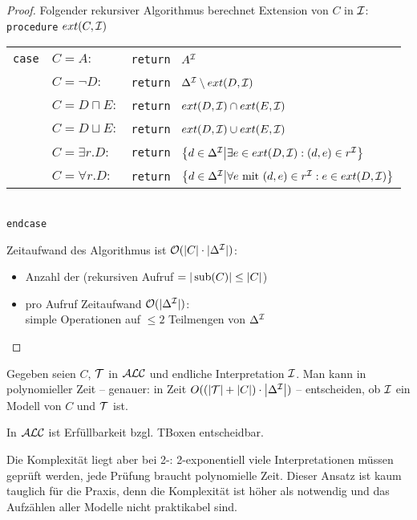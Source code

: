 \begin{proof}
    Folgender rekursiver Algorithmus berechnet Extension von $C$ in $\mathcal{I}$:\\
    \texttt{procedure} $ext(C, \mathcal{I})$\\
    \begin{tabular}{l l l}
        \texttt{case} & $C = A:$ & \texttt{return } $A^{\mathcal{I}}$\\
                      & $C = \neg D:$ & \texttt{return }
        $\Delta^{\mathcal{I}} \setminus ext(D, \mathcal{I})$\\
                      & $C = D \sqcap E:$ & \texttt{return }
        $ext(D, \mathcal{I}) \cap ext(E, \mathcal{I})$\\
                      & $C = D \sqcup E:$ & \texttt{return }
        $ext(D, \mathcal{I}) \cup ext(E, \mathcal{I})$\\
                      & $C = \exists r.D:$ & \texttt{return }
        $\left\{d\in \Delta^\MI \middle| \exists e\in ext(D, \MI) : (d, e) \in r^\MI\right\}$\\
                      & $C = \forall r.D:$ & \texttt{return }
        $\left\{d\in \Delta^\MI \middle| \forall e \text{ mit } (d, e) \in r^\MI : e\in ext(D, \MI)\right\}$\\
    \end{tabular}\\
    \texttt{endcase}

    Zeitaufwand des Algorithmus ist $\mathcal{O}(|C| \cdot |\Delta^{\mathcal{I}}|)$:
    \begin{itemize}
        \item Anzahl der (rekursiven Aufruf $= |\operatorname{sub}(C)| \leq |C|$)
        \item pro Aufruf Zeitaufwand $\mathcal{O}(|\Delta^{\mathcal{I}}|)$: \\
            simple Operationen auf $\leq 2$ Teilmengen von $\Delta^{\mathcal{I}}$
    \end{itemize}
\end{proof}

\begin{korollar}
Gegeben seien $C$, $\mathcal{T}$ in $\mathcal{A}\mathcal{L}\mathcal{C}$ und endliche Interpretation $\mathcal{I}$. Man kann in polynomieller Zeit -- genauer: in Zeit $O(\left( \left| \MT \right| + \left| C \right| \right) \cdot \left| \Delta^\MI \right|)$ -- entscheiden, ob $\mathcal{I}$ ein Modell von $C$ und $\mathcal{T}$ ist.
\end{korollar}

\begin{theorem}
In $\mathcal{A}\mathcal{L}\mathcal{C}$ ist Erfüllbarkeit bzgl. TBoxen entscheidbar.
\end{theorem}

Die Komplexität liegt aber bei 2-\ExpTime: 2-exponentiell viele
Interpretationen müssen geprüft werden, jede Prüfung braucht polynomielle Zeit.
Dieser Ansatz ist kaum tauglich für die Praxis, denn die Komplexität ist höher
als notwendig und das Aufzählen aller Modelle nicht praktikabel sind.
